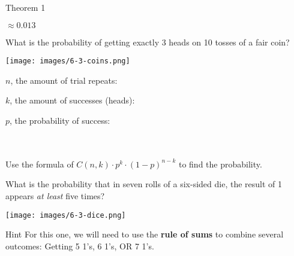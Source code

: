{\begin{intro}{Theorem 1}
            \begin{center}
                $ \approx 0.013 $
            \end{center}
        \end{intro}

    \newpage

    \begin{questionNOGRADE}{\thequestion}

        What is the probability of getting exactly 3 heads
        on 10 tosses of a fair coin?
        
        \begin{center}
            \texttt{[image: images/6-3-coins.png]}
        \end{center}

        \vspace{1cm}
        
        $n$, the amount of trial repeats:
        
        \vspace{1cm}
        
        $k$, the amount of successes (heads):
        
        \vspace{1cm}
        
        $p$, the probability of success:

        ~\\~\\
        Use the formula of $ C(n, k) \cdot p^{k} \cdot (1 - p)^{n-k} $
        to find the probability.
    \end{questionNOGRADE}

    \newpage

        
    \begin{questionNOGRADE}{\thequestion}
        What is the probability that in seven rolls of a six-sided die,
        the result of 1 appears \textit{at least} five times?

        \begin{center}
            \texttt{[image: images/6-3-dice.png]}
        \end{center}

        \begin{hint}{Hint}
            For this one, we will need to use the \textbf{rule of sums}
            to combine several outcomes: Getting 5 1's, 6 1's, OR 7 1's.
        \end{hint}


\end{questionNOGRADE}}
